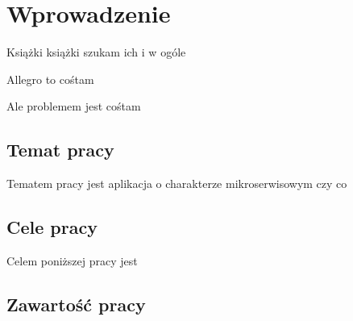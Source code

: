 \chapter{Wprowadzenie}
\label{cha:wprowadzenie}

Książki książki szukam ich i w ogóle

Allegro to cośtam

Ale problemem jest cośtam


\section{Temat pracy}
\label{sec:tematPracy}

Tematem pracy jest aplikacja o charakterze mikroserwisowym czy co



\section{Cele pracy}
\label{sec:celePracy}


Celem poniższej pracy jest 



\section{Zawartość pracy}
\label{sec:zawartoscPracy}


